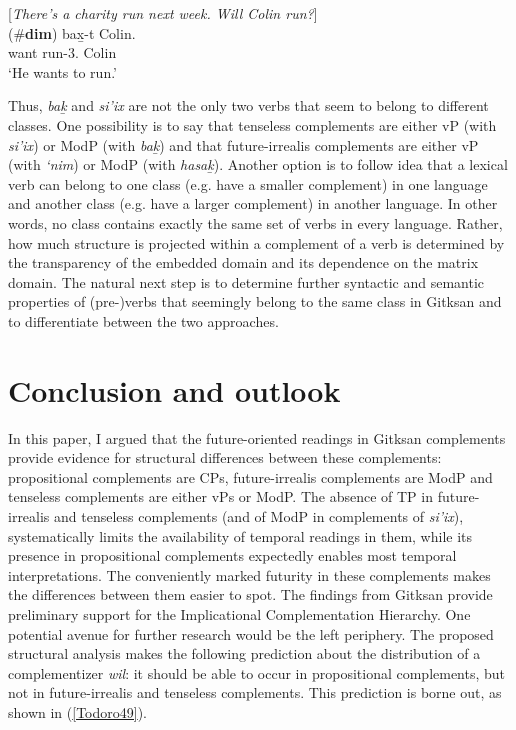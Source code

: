 \documentclass[output=paper]{langscibook}
\begin{document}
\begin{exe}
\ex \label{Todoro48}
[\emph{There’s a charity run next week. Will Colin run?}] \\
	  (\#{\textbf{dim}})	{bax̱-t}          {Colin}.\\ 
want	   	run-3.{\seriesII} 	Colin\\
\glt ‘He wants to run.’	
\end{exe}


Thus, \emph{bak̲} and \emph{si’ix} are not the only two verbs that seem to belong to different classes. One possibility is to say that tenseless complements are either vP (with \emph{si’ix}) or ModP (with \emph{bak̲}) and that future-irrealis complements are either vP (with \emph{‘nim}) or ModP (with \emph{hasak̲}). Another option is to follow  idea that a lexical verb can belong to one class (e.g. have a smaller complement) in one language and another class (e.g. have a larger complement) in another language. In other words, no class contains exactly the same  set of verbs in every language. Rather, how much structure is projected within a complement of a verb is determined by the transparency of the embedded domain and its dependence on the matrix domain. The natural next step is to determine further syntactic and semantic properties of (pre-)verbs that seemingly belong to the same class in Gitksan and to differentiate between the two approaches.

\section{Conclusion and outlook}\label{Todoro:sect6}

In this paper, I argued that the future-oriented readings in Gitksan complements provide evidence for structural differences between these complements: propositional complements are CPs, future-irrealis complements are ModP and tenseless complements are either vPs or ModP. The absence of TP in future-irrealis and tenseless complements (and of ModP in complements of \emph{si’ix}), systematically limits the availability of temporal readings in them, while its presence in propositional complements expectedly enables most temporal interpretations. The conveniently marked futurity in these complements makes the differences between them easier to spot. The findings from Gitksan provide preliminary support for the Implicational Complementation Hierarchy. 
One potential avenue for further research would be the left periphery. The proposed structural analysis makes the following prediction about the distribution of a complementizer \emph{wil}: it should be able to occur in propositional complements, but not in future-irrealis and tenseless complements. This prediction is borne out, as shown in (\ref{Todoro49}). 
\end{document}
